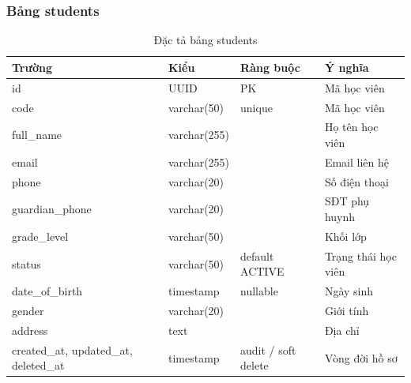 \documentclass[../DoAn.tex]{subfiles}
\begin{document}
\subsubsection{Bảng students}
\begin{table}[H]
\centering
\caption{Đặc tả bảng students}
\scriptsize
\begin{tabular}{|l|l|l|p{4cm}|}
\hline
\textbf{Trường} & \textbf{Kiểu} & \textbf{Ràng buộc} & \textbf{Ý nghĩa} \\ \hline
id & UUID & PK & Mã học viên \\ \hline
code & varchar(50) & unique & Mã học viên \\ \hline
full\_name & varchar(255) & & Họ tên học viên \\ \hline
email & varchar(255) & & Email liên hệ \\ \hline
phone & varchar(20) & & Số điện thoại \\ \hline
guardian\_phone & varchar(20) & & SĐT phụ huynh \\ \hline
grade\_level & varchar(50) & & Khối lớp \\ \hline
status & varchar(50) & default ACTIVE & Trạng thái học viên \\ \hline
date\_of\_birth & timestamp & nullable & Ngày sinh \\ \hline
gender & varchar(20) & & Giới tính \\ \hline
address & text & & Địa chỉ \\ \hline
created\_at, updated\_at, deleted\_at & timestamp & audit / soft delete & Vòng đời hồ sơ \\ \hline
\end{tabular}
\end{table}
\end{document}
